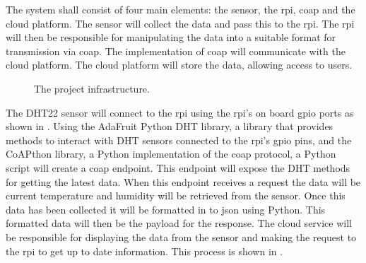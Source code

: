 The system shall consist of four main elements: the sensor, the \gls{rpi}, \gls{coap} and the cloud platform.
The sensor will collect the data and pass this to the \gls{rpi}. The \gls{rpi} will then be responsible for manipulating
the data into a suitable format for transmission via \gls{coap}. The implementation of \gls{coap} will communicate with
the cloud platform. The cloud platform will store the data, allowing access to users.

\begin{figure}[H]
    \centering
    \caption{\label{fig:proj_framework} The project infrastructure.}
\end{figure}


The DHT22 sensor will connect to the \gls{rpi} using the \gls{rpi}'s on board \gls{gpio} ports as shown in . 
Using the AdaFruit Python DHT library, a library that provides methods to interact with DHT sensors connected to the \gls{rpi}'s \gls{gpio} pins, 
and the CoAPthon library, a Python implementation of the \gls{coap} protocol, a Python script will create a \gls{coap} endpoint. This endpoint will expose 
the DHT methods for getting the latest data. When this endpoint receives a request the data will be current temperature and humidity will be
retrieved from the sensor. Once this data has been collected it will be formatted in to \gls{json} using Python. This formatted data will then
be the payload for the response. The cloud service will be responsible for displaying the data from the sensor and making the request to the 
\gls{rpi} to get up to date information. This process is shown in .


